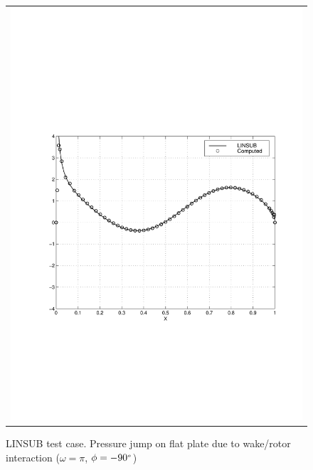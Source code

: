 \begin{figure}
\begin{center}
\begin{tabular}{c}
{        \includegraphics[width=110mm,clip=t]{CHAP_LINEAR/FIGURE/lins_wake2.pdf}}
   \end{tabular}
 \end{center}
 \vspace{-8mm}
 \caption{LINSUB test case. Pressure jump on flat plate due to wake/rotor interaction
          ($\omega = \pi$, $\phi = -90^{\mbox{\tiny $o$}}$)}
 \label{linsub_wake.fig}
\end{figure}
%
